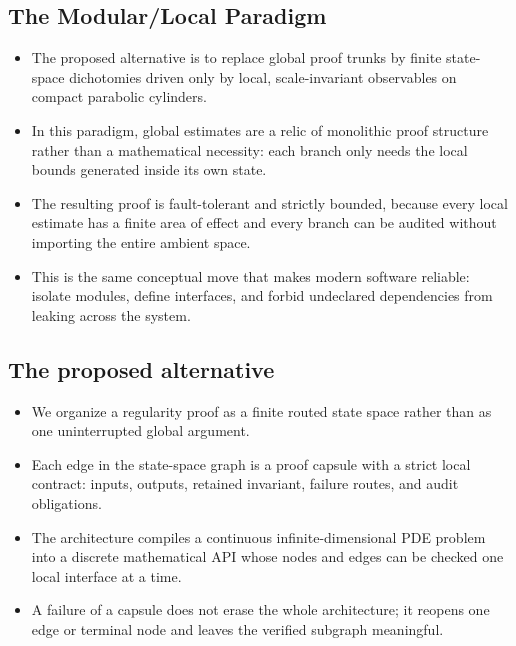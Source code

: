 \documentclass[11pt]{article}
\theoremstyle{plain}
\theoremstyle{definition}
\theoremstyle{remark}
\begin{document}
\subsection{The Modular/Local Paradigm}
\begin{itemize}
  \item The proposed alternative is to replace global proof trunks by finite state-space dichotomies driven only by local, scale-invariant observables on compact parabolic cylinders.
  \item In this paradigm, global estimates are a relic of monolithic proof structure rather than a mathematical necessity: each branch only needs the local bounds generated inside its own state.
  \item The resulting proof is fault-tolerant and strictly bounded, because every local estimate has a finite area of effect and every branch can be audited without importing the entire ambient space.
  \item This is the same conceptual move that makes modern software reliable: isolate modules, define interfaces, and forbid undeclared dependencies from leaking across the system.
\end{itemize}

\subsection{The proposed alternative}
\begin{itemize}
  \item We organize a regularity proof as a finite routed state space rather than as one uninterrupted global argument.
  \item Each edge in the state-space graph is a proof capsule with a strict local contract: inputs, outputs, retained invariant, failure routes, and audit obligations.
  \item The architecture compiles a continuous infinite-dimensional PDE problem into a discrete mathematical API whose nodes and edges can be checked one local interface at a time.
  \item A failure of a capsule does not erase the whole architecture; it reopens one edge or terminal node and leaves the verified subgraph meaningful.
\end{itemize}
\end{document}
